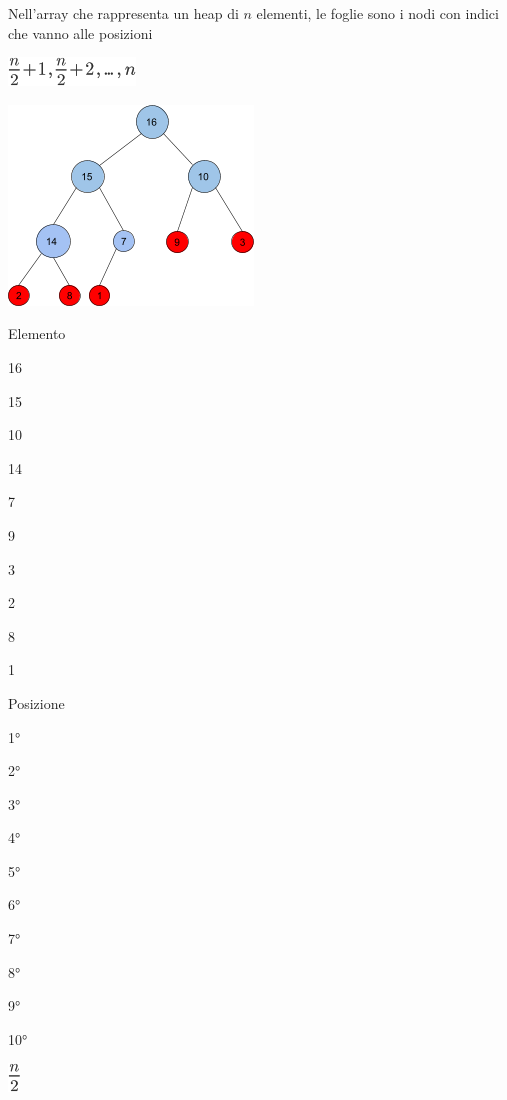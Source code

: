 \documentclass{article}
\begin{document}
{{Nell'array che rappresenta un heap di $n$ elementi, le foglie sono i nodi con indici che vanno alle posizioni}

{}

\includegraphics{images/image123.png}

{}

{\includegraphics{images/image526.png}}

{}

\protect\hypertarget{t.0db836340677fe77e6dcdbae821987d7a7a9aed8}{}{}\protect\hypertarget{t.15}{}{}

{Elemento}

{16}

{15}

{10}

{14}

{7}

{9}

{3}

{2}

{8}

{1}

{Posizione}

{1°}

{2°}

{3°}

{4°}

{5°}

{6°}

{7°}

{8°}

{9°}

{10°}

{}

{}

{}

{}

\includegraphics{images/image124.png}

}
\end{document}

